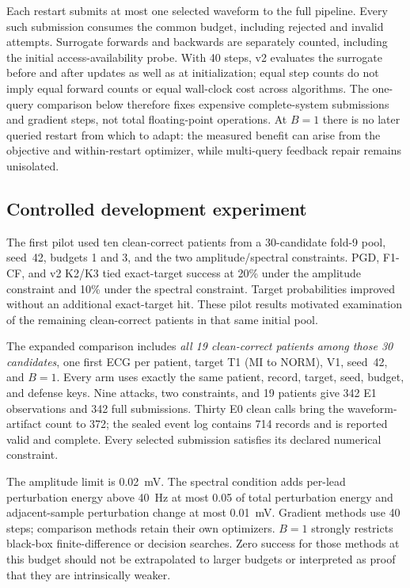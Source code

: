 Each restart submits at most one selected waveform to the full pipeline. Every such submission consumes the common budget, including rejected and invalid attempts. Surrogate forwards and backwards are separately counted, including the initial access-availability probe. With 40 steps, v2 evaluates the surrogate before and after updates as well as at initialization; equal step counts do not imply equal forward counts or equal wall-clock cost across algorithms. The one-query comparison below therefore fixes expensive complete-system submissions and gradient steps, not total floating-point operations. At $B=1$ there is no later queried restart from which to adapt: the measured benefit can arise from the objective and within-restart optimizer, while multi-query feedback repair remains unisolated.

\subsection{Controlled development experiment}
The first pilot used ten clean-correct patients from a 30-candidate fold-9 pool, seed~42, budgets 1 and 3, and the two amplitude/spectral constraints. PGD, F1-CF, and v2 K2/K3 tied exact-target success at 20\% under the amplitude constraint and 10\% under the spectral constraint. Target probabilities improved without an additional exact-target hit. These pilot results motivated examination of the remaining clean-correct patients in that same initial pool.

The expanded comparison includes \emph{all 19 clean-correct patients among those 30 candidates}, one first ECG per patient, target T1 (MI to NORM), V1, seed~42, and $B=1$. Every arm uses exactly the same patient, record, target, seed, budget, and defense keys. Nine attacks, two constraints, and 19 patients give 342 E1 observations and 342 full submissions. Thirty E0 clean calls bring the waveform-artifact count to 372; the sealed event log contains 714 records and is reported valid and complete. Every selected submission satisfies its declared numerical constraint.

The amplitude limit is 0.02~mV. The spectral condition adds per-lead perturbation energy above 40~Hz at most 0.05 of total perturbation energy and adjacent-sample perturbation change at most 0.01~mV. Gradient methods use 40 steps; comparison methods retain their own optimizers. $B=1$ strongly restricts black-box finite-difference or decision searches. Zero success for those methods at this budget should not be extrapolated to larger budgets or interpreted as proof that they are intrinsically weaker.

